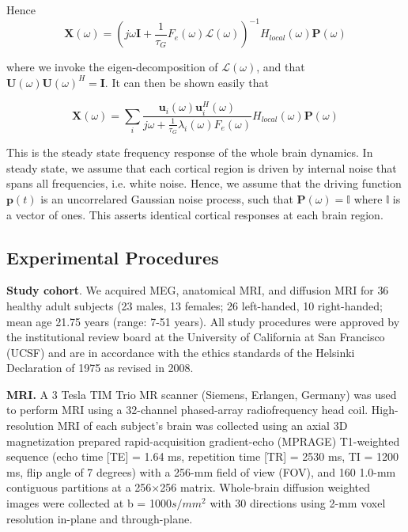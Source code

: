 Hence
\begin{equation}
\label{eq:lap_sgm}
\mathbf{X}(\omega) = (j\omega\mathbf{I} + \frac{1}{\tau_{G}} F_{e}(\omega) \mathcal{L}(\omega))^{-1} H_{local}(\omega)\mathbf{P}(\omega)
\end{equation}

where we invoke the eigen-decomposition of $\mathcal{L}(\omega)$, and
that $\mathbf{U}(\omega){\mathbf{U}(\omega)}^{H} = \mathbf{I}$. It
can then be shown easily that

\begin{equation}
\label{eq:sgm}
\mathbf{X}(\omega) =\sum_{i}\frac{\mathbf{u}_{i}(\omega)\mathbf{u}_{i}^{H}(\omega)}{j\omega + \frac{1}{\tau_{G}}\lambda_{i}(\omega) F_{e}(\omega)} H_{local}(\omega) \mathbf{P}(\omega)
\end{equation}

This is the steady state frequency response of the whole brain dynamics.
In steady state, we assume that each cortical region is driven by
internal noise that spans all frequencies, i.e. white noise. Hence, we
assume that the driving function $\mathbf{p}(t)$ is an uncorrelared
Gaussian noise process, such that
$\mathbf{P}(\omega) = \mathbb{I}$ where $\mathbb{l}$ is a vector of
ones. This asserts identical cortical responses at each brain region.

\subsection{Experimental Procedures}
\textbf{Study cohort}. We acquired MEG, anatomical MRI, and diffusion
MRI for 36 healthy adult subjects (23 males, 13 females; 26 left-handed,
10 right-handed; mean age 21.75 years (range: 7-51 years). All study
procedures were approved by the institutional review board at the
University of California at San Francisco (UCSF) and are in accordance
with the ethics standards of the Helsinki Declaration of 1975 as revised
in 2008.

\textbf{MRI.} A 3 Tesla TIM Trio MR scanner (Siemens, Erlangen,
Germany) was used to perform MRI using a 32-channel phased-array
radiofrequency head coil. High-resolution MRI of each subject's brain
was collected using an axial 3D magnetization prepared rapid-acquisition
gradient-echo (MPRAGE) T1-weighted sequence (echo time {[}TE{]} = 1.64
ms, repetition time {[}TR{]} = 2530 ms, TI = 1200 ms, flip angle of 7
degrees) with a 256-mm field of view (FOV), and 160 1.0-mm contiguous
partitions at a 256×256 matrix. Whole-brain diffusion weighted images
were collected at b = 1000$s/mm^{2}$ with 30 directions using 2-mm
voxel resolution in-plane and through-plane.


